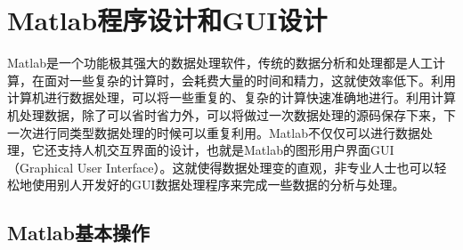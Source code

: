\section{Matlab程序设计和GUI设计}
Matlab是一个功能极其强大的数据处理软件，传统的数据分析和处理都是人工计算，在面对一些复杂的计算时，会耗费大量的时间和精力，这就使效率低下。利用计算机进行数据处理，可以将一些重复的、复杂的计算快速准确地进行。利用计算机处理数据，除了可以省时省力外，可以将做过一次数据处理的源码保存下来，下一次进行同类型数据处理的时候可以重复利用。Matlab不仅仅可以进行数据处理，它还支持人机交互界面的设计，也就是Matlab的图形用户界面GUI（Graphical User Interface）。这就使得数据处理变的直观，非专业人士也可以轻松地使用别人开发好的GUI数据处理程序来完成一些数据的分析与处理。
\subsection{Matlab基本操作}
